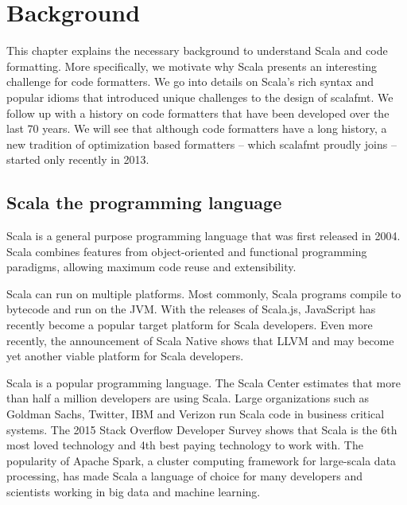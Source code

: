 \newcommand{\naive}{na\"{\i}ve}
\newcommand{\dartfmt}{\texttt{dartfmt}}
\newcommand{\gofmt}{\texttt{gofmt}}
\newcommand{\rfmt}{\texttt{rfmt}}
\section{Background}
This chapter explains the necessary background to understand Scala and code formatting.
More specifically, we motivate why Scala presents an interesting challenge for code formatters.
We go into details on Scala's rich syntax and popular idioms that introduced unique challenges to the design of scalafmt.
We follow up with a history on code formatters that have been developed over the last 70 years.
We will see that although code formatters have a long history, a new tradition of optimization based formatters -- which scalafmt proudly joins -- started only recently in 2013.

\subsection{Scala the programming language}
Scala\autocite{odersky_scala_2004} is a general purpose programming language that was first released in 2004.
Scala combines features from object-oriented and functional programming paradigms, allowing maximum code reuse and extensibility.

Scala can run on multiple platforms.
Most commonly, Scala programs compile to bytecode and run on the JVM.
With the releases of Scala.js\autocite{doeraene_scala.js_2015}, JavaScript has recently become a popular target platform for Scala developers.
Even more recently, the announcement of Scala Native\autocite{_scala-native/scala-native_????} shows that LLVM and may become yet another viable platform for Scala developers.

Scala is a popular programming language.
The Scala Center estimates that more than half a million developers are using Scala\autocite{odersky_scala_2016}.
Large organizations such as Goldman Sachs, Twitter, IBM and Verizon run Scala code in business critical systems.
The 2015 Stack Overflow Developer Survey shows that Scala is the 6th most loved technology and 4th best paying technology to work with\autocite{_stack_????}.
The popularity of Apache Spark\autocite{_apache_????-1}, a cluster computing framework for large-scala data processing, has made Scala a language of choice for many developers and scientists working in big data and machine learning.

